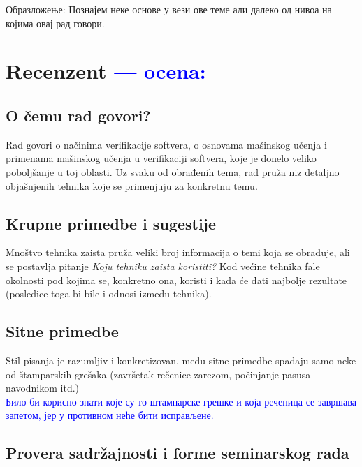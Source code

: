 \documentclass[a4paper]{report}
\newcommand{\odgovor}[1]{\textcolor{blue}{#1}}
\newcommand{\say}[1]{\textit{#1}}
\begin{document}
Образложење: Познајем неке основе у вези ове теме али далеко од нивоа на којима овај рад говори.


\chapter{Recenzent \odgovor{--- ocena:} }


\section{O čemu rad govori?}
Rad govori o načinima verifikacije softvera, o osnovama mašinskog učenja i primenama mašinskog učenja u verifikaciji softvera, koje je donelo veliko poboljšanje u toj oblasti. Uz svaku od obrađenih tema, rad pruža niz detaljno objašnjenih tehnika koje se primenjuju za konkretnu temu.

\section{Krupne primedbe i sugestije}
Mnoštvo tehnika zaista pruža veliki broj informacija o temi koja se obrađuje, ali se postavlja pitanje \say {Koju tehniku zaista koristiti?} Kod većine tehnika fale okolnosti pod kojima se, konkretno ona, koristi i kada će dati najbolje rezultate (posledice toga bi bile i odnosi između tehnika).
\section{Sitne primedbe}
Stil pisanja je razumljiv i konkretizovan, među sitne primedbe spadaju samo neke od štamparskih grešaka (završetak rečenice zarezom, počinjanje pasusa navodnikom itd.)\\

\odgovor{Било би корисно знати које су то штампарске грешке и која реченица се завршава запетом, јер у противном неће бити исправљене.}\\


\section{Provera sadržajnosti i forme seminarskog rada}
\end{document}
